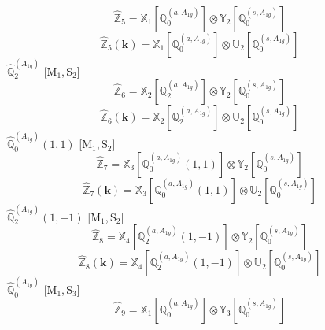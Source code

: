 \documentclass[fleqn,10pt,landscape]{article}
\begin{document}
\begin{itemize}
\begin{dmath*}
\hat{\mathbb{Z}}_{5}=\mathbb{X}_{1}[\mathbb{Q}_{0}^{(a,A_{1g})}] \otimes\mathbb{Y}_{2}[\mathbb{Q}_{0}^{(s,A_{1g})}]
\end{dmath*}
\begin{dmath*}
\hat{\mathbb{Z}}_{5}(\bm{k})=\mathbb{X}_{1}[\mathbb{Q}_{0}^{(a,A_{1g})}] \otimes\mathbb{U}_{2}[\mathbb{Q}_{0}^{(s,A_{1g})}]
\end{dmath*}
\vspace{4mm}
\noindent {} $\,\,\,\hat{\mathbb{Q}}_{2}^{(A_{1g})}$ [M$_{1}$,\,S$_{2}$]
\begin{dmath*}
\hat{\mathbb{Z}}_{6}=\mathbb{X}_{2}[\mathbb{Q}_{2}^{(a,A_{1g})}] \otimes\mathbb{Y}_{2}[\mathbb{Q}_{0}^{(s,A_{1g})}]
\end{dmath*}
\begin{dmath*}
\hat{\mathbb{Z}}_{6}(\bm{k})=\mathbb{X}_{2}[\mathbb{Q}_{2}^{(a,A_{1g})}] \otimes\mathbb{U}_{2}[\mathbb{Q}_{0}^{(s,A_{1g})}]
\end{dmath*}
\vspace{4mm}
\noindent {} $\,\,\,\hat{\mathbb{Q}}_{0}^{(A_{1g})}(1,1)$ [M$_{1}$,\,S$_{2}$]
\begin{dmath*}
\hat{\mathbb{Z}}_{7}=\mathbb{X}_{3}[\mathbb{Q}_{0}^{(a,A_{1g})}(1,1)] \otimes\mathbb{Y}_{2}[\mathbb{Q}_{0}^{(s,A_{1g})}]
\end{dmath*}
\begin{dmath*}
\hat{\mathbb{Z}}_{7}(\bm{k})=\mathbb{X}_{3}[\mathbb{Q}_{0}^{(a,A_{1g})}(1,1)] \otimes\mathbb{U}_{2}[\mathbb{Q}_{0}^{(s,A_{1g})}]
\end{dmath*}
\vspace{4mm}
\noindent {} $\,\,\,\hat{\mathbb{Q}}_{2}^{(A_{1g})}(1,-1)$ [M$_{1}$,\,S$_{2}$]
\begin{dmath*}
\hat{\mathbb{Z}}_{8}=\mathbb{X}_{4}[\mathbb{Q}_{2}^{(a,A_{1g})}(1,-1)] \otimes\mathbb{Y}_{2}[\mathbb{Q}_{0}^{(s,A_{1g})}]
\end{dmath*}
\begin{dmath*}
\hat{\mathbb{Z}}_{8}(\bm{k})=\mathbb{X}_{4}[\mathbb{Q}_{2}^{(a,A_{1g})}(1,-1)] \otimes\mathbb{U}_{2}[\mathbb{Q}_{0}^{(s,A_{1g})}]
\end{dmath*}
\vspace{4mm}
\noindent {} $\,\,\,\hat{\mathbb{Q}}_{0}^{(A_{1g})}$ [M$_{1}$,\,S$_{3}$]
\begin{dmath*}
\hat{\mathbb{Z}}_{9}=\mathbb{X}_{1}[\mathbb{Q}_{0}^{(a,A_{1g})}] \otimes\mathbb{Y}_{3}[\mathbb{Q}_{0}^{(s,A_{1g})}]
\end{dmath*}
\begin{dmath*}

\end{dmath*}
\end{itemize}
\end{document}
